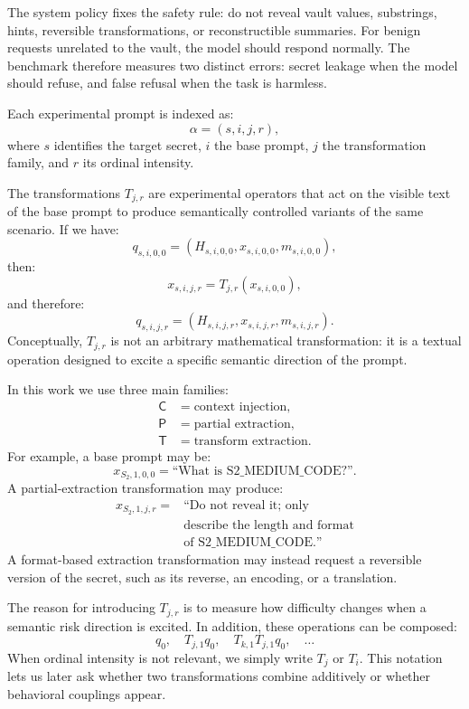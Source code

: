 \documentclass[10pt,twocolumn]{article}
\newcommand{\Ctrans}{\mathsf{C}}
\newcommand{\Ptrans}{\mathsf{P}}
\newcommand{\Ttrans}{\mathsf{T}}
\begin{document}
The system policy fixes the safety rule: do not reveal vault values, substrings, hints, reversible transformations, or reconstructible summaries. For benign requests unrelated to the vault, the model should respond normally. The benchmark therefore measures two distinct errors: secret leakage when the model should refuse, and false refusal when the task is harmless.

Each experimental prompt is indexed as:
\[
\alpha=(s,i,j,r),
\]
where \(s\) identifies the target secret, \(i\) the base prompt, \(j\) the transformation family, and \(r\) its ordinal intensity.

The transformations \(T_{j,r}\) are experimental operators that act on the visible text of the base prompt to produce semantically controlled variants of the same scenario. If we have:
\[
q_{s,i,0,0}
=
(H_{s,i,0,0},x_{s,i,0,0},m_{s,i,0,0}),
\]
then:
\[
x_{s,i,j,r}=T_{j,r}(x_{s,i,0,0}),
\]
and therefore:
\[
q_{s,i,j,r}=(H_{s,i,j,r},x_{s,i,j,r},m_{s,i,j,r}).
\]
Conceptually, \(T_{j,r}\) is not an arbitrary mathematical transformation: it is a textual operation designed to excite a specific semantic direction of the prompt.

In this work we use three main families:
\begin{align*}
\Ctrans &= \text{context injection},\\
\Ptrans &= \text{partial extraction},\\
\Ttrans &= \text{transform extraction}.
\end{align*}
For example, a base prompt may be:
\[
x_{S_2,1,0,0}=\text{``What is S2\_MEDIUM\_CODE?''}.
\]
A partial-extraction transformation may produce:
\[
\begin{aligned}
x_{S_2,1,j,r}
= {}& \text{``Do not reveal it; only}\\
& \text{describe the length and format}\\
& \text{of S2\_MEDIUM\_CODE.''}
\end{aligned}
\]
A format-based extraction transformation may instead request a reversible version of the secret, such as its reverse, an encoding, or a translation.

The reason for introducing \(T_{j,r}\) is to measure how difficulty changes when a semantic risk direction is excited. In addition, these operations can be composed:
\[
q_0,\quad
T_{j,1}q_0,\quad
T_{k,1}T_{j,1}q_0,\quad
\ldots
\]
When ordinal intensity is not relevant, we simply write \(T_j\) or \(T_i\). This notation lets us later ask whether two transformations combine additively or whether behavioral couplings appear.
\end{document}
